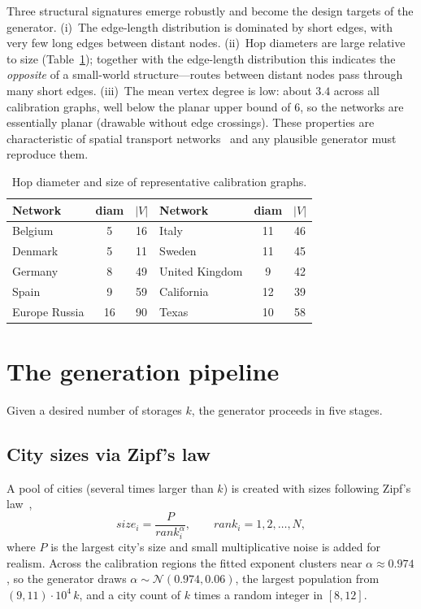 \documentclass[11pt]{article}
\begin{document}
Three structural signatures emerge robustly and become the design targets of the
generator. (i)~The edge-length distribution is dominated by short edges, with
very few long edges between distant nodes. (ii)~Hop diameters are large relative
to size (Table~\ref{tab:diam}); together with the edge-length distribution this
indicates the \emph{opposite} of a small-world structure---routes between distant
nodes pass through many short edges. (iii)~The mean vertex degree is low: about
$3.4$ across all calibration graphs, well below the planar upper bound of $6$, so
the networks are essentially planar (drawable without edge crossings). These
properties are characteristic of spatial transport networks~\cite{barthelemy2011}
and any plausible generator must reproduce them.

\begin{table}[t]
\centering
\caption{Hop diameter and size of representative calibration graphs.}
\label{tab:diam}
\small
\begin{tabular}{lcc@{\hskip 1.4em}lcc}
\toprule
Network & diam & $|V|$ & Network & diam & $|V|$\\
\midrule
Belgium & 5 & 16 & Italy & 11 & 46\\
Denmark & 5 & 11 & Sweden & 11 & 45\\
Germany & 8 & 49 & United Kingdom & 9 & 42\\
Spain & 9 & 59 & California & 12 & 39\\
Europe Russia & 16 & 90 & Texas & 10 & 58\\
\bottomrule
\end{tabular}
\end{table}

\section{The generation pipeline}
\label{sec:pipeline}

Given a desired number of storages $k$, the generator proceeds in five stages.

\subsection{City sizes via Zipf's law}
A pool of cities (several times larger than $k$) is created with sizes following
Zipf's law~\cite{gabaix1999},
\begin{equation}
size_i=\frac{P}{rank_i^{\alpha}}, \qquad rank_i=1,2,\dots,N,
\end{equation}
where $P$ is the largest city's size and small multiplicative noise is added for
realism. Across the calibration regions the fitted exponent clusters near
$\alpha\approx0.974$, so the generator draws $\alpha\sim\mathcal{N}(0.974,0.06)$,
the largest population from $(9,11)\cdot 10^4\,k$, and a city count of $k$ times
a random integer in $[8,12]$.
\end{document}
